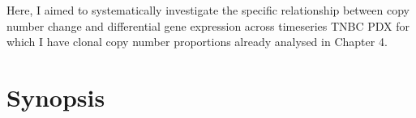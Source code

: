 Here, I aimed to systematically investigate the specific relationship between copy number change and differential gene expression across timeseries TNBC PDX for which I have clonal copy number proportions already analysed in Chapter 4. 




 \section{Synopsis}





 
